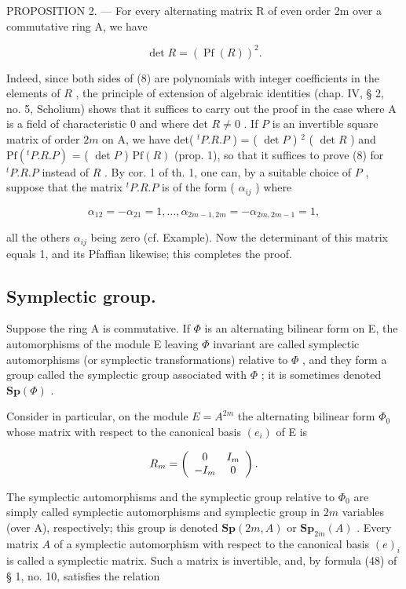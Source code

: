 PROPOSITION 2. --- For every alternating matrix R of even order 2m over a commutative ring A, we have

\[
\det R = (\operatorname{Pf} (R)) ^ {2}.\tag{8}
\]

Indeed, since both sides of (8) are polynomials with integer coefficients in the elements of \(R\) , the principle of extension of algebraic identities (chap. IV, § 2, no. 5, Scholium) shows that it suffices to carry out the proof in the case where A is a field of characteristic 0 and where det \(R \neq 0\) . If \(P\) is an invertible square matrix of order \(2m\) on A, we have det( \(^{t}P.R.P\) ) = ( \(\det P\) ) \(^{2}\) ( \(\det R\) ) and \(\mathrm{Pf}(^{t}P.R.P)\) = ( \(\det P\) ) \(\mathrm{Pf}(R)\) (prop. 1), so that it suffices to prove (8) for \(^{t}P.R.P\) instead of \(R\) . By cor. 1 of th. 1, one can, by a suitable choice of \(P\) , suppose that the matrix \(^{t}P.R.P\) is of the form ( \(\alpha_{ij}\) ) where

\[
\alpha_ {1 2} = - \alpha_ {2 1} = 1, \dots , \alpha_ {2 m - 1, 2 m} = - \alpha_ {2 m, 2 m - 1} = 1,
\]

all the others \(\alpha_{ij}\) being zero (cf. Example). Now the determinant of this matrix equals 1, and its Pfaffian likewise; this completes the proof.

\subsection{Symplectic group.}

Suppose the ring A is commutative. If \(\Phi\) is an alternating bilinear form on E, the automorphisms of the module E leaving \(\Phi\) invariant are called symplectic automorphisms (or symplectic transformations) relative to \(\Phi\) , and they form a group called the symplectic group associated with \(\Phi\) ; it is sometimes denoted \(\mathbf{Sp}(\Phi)\) .

Consider in particular, on the module \(E = A^{2m}\) the alternating bilinear form \(\Phi_{0}\) whose matrix with respect to the canonical basis \((e_{i})\) of E is

\[
R _ {m} = \left( \begin{array}{c c} 0 & I _ {m} \\ - I _ {m} & 0 \end{array} \right).
\]

The symplectic automorphisms and the symplectic group relative to \(\Phi_{0}\) are simply called symplectic automorphisms and symplectic group in \(2m\) variables (over A), respectively; this group is denoted \(\mathbf{Sp}(2m, A)\) or \(\mathbf{Sp}_{2m}(A)\) . Every matrix \(A\) of a symplectic automorphism with respect to the canonical basis \((e)_i\) is called a symplectic matrix. Such a matrix is invertible, and, by formula (48) of § 1, no. 10, satisfies the relation

